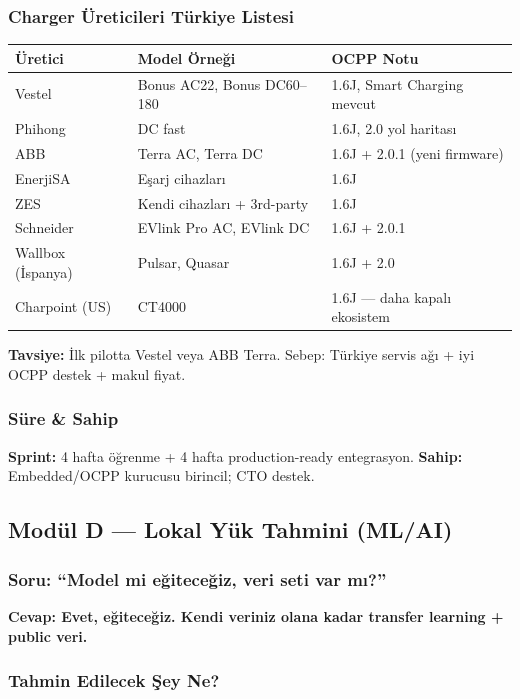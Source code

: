 \documentclass[11pt,a4paper]{article}
\begin{document}
\subsubsection{Charger Üreticileri Türkiye Listesi}

\begin{tabularx}{\textwidth}{l l X}
\toprule
\textbf{Üretici} & \textbf{Model Örneği} & \textbf{OCPP Notu} \\
\midrule
Vestel & Bonus AC22, Bonus DC60--180 & 1.6J, Smart Charging mevcut \\
Phihong & DC fast & 1.6J, 2.0 yol haritası \\
ABB & Terra AC, Terra DC & 1.6J + 2.0.1 (yeni firmware) \\
EnerjiSA & Eşarj cihazları & 1.6J \\
ZES & Kendi cihazları + 3rd-party & 1.6J \\
Schneider & EVlink Pro AC, EVlink DC & 1.6J + 2.0.1 \\
Wallbox (İspanya) & Pulsar, Quasar & 1.6J + 2.0 \\
Charpoint (US) & CT4000 & 1.6J — daha kapalı ekosistem \\
\bottomrule
\end{tabularx}

\textbf{Tavsiye:} İlk pilotta Vestel veya ABB Terra. Sebep: Türkiye servis ağı + iyi OCPP destek + makul fiyat.

\subsubsection{Süre \& Sahip}
\textbf{Sprint:} 4 hafta öğrenme + 4 hafta production-ready entegrasyon. \textbf{Sahip:} Embedded/OCPP kurucusu birincil; CTO destek.

\subsection{Modül D — Lokal Yük Tahmini (ML/AI)}

\subsubsection{Soru: ``Model mi eğiteceğiz, veri seti var mı?''}

\textbf{Cevap: Evet, eğiteceğiz. Kendi veriniz olana kadar transfer learning + public veri.}

\subsubsection{Tahmin Edilecek Şey Ne?}
\end{document}
